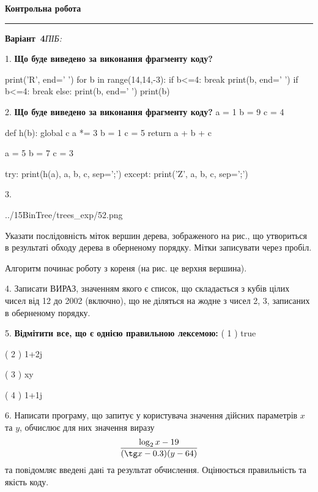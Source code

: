 \documentclass[11pt]{article}
\begin{document}
{\centering\Large\bfseries Контрольна робота\par}
\medskip
\noindent\rule{\linewidth}{0.5pt}
\smallskip
\noindent\textbf{Варіант \No\,4}\hfill \textit{ПІБ:}\,\underline{\hspace{60mm}}
\vspace{4mm}

1. \textbf{Що буде виведено за виконання фрагменту коду?}

print('R', end=' ')
for b in range(14,14,-3):
    if b<=4:
        break
        print(b, end=' ')
    if b<=4:
        break
    else:
        print(b, end=' ')
    print(b)
\vspace{5mm}

2. \textbf{Що буде виведено за виконання фрагменту коду?}
a = 1
b = 9
c = 4

def h(b):
global c    a *= 3
    b = 1
    c = 5
    return a + b + c

a = 5
b = 7
c = 3

try:
    print(h(a), a, b, c, sep=';')
except:
    print('Z', a, b, c, sep=';')
\vspace{5mm}

3. 

\begin{center}
	{../15BinTree/trees_exp/52.png}
\end{center}
Указати послідовність міток вершин дерева, зображеного на рис., що утвориться в результаті обходу дерева в оберненому порядку. Мітки записувати через пробіл.\par Алгоритм починає роботу з кореня (на рис. це верхня вершина).
\vspace{5mm}

4. 
Записати ВИРАЗ, значенням якого є список, що складається з кубів цілих чисел від 12 до 2002 (включно), що не діляться на жодне з чисел 2, 3, записаних в оберненому порядку.\vspace{5mm}

5. %
\textbf{Відмітити все, що є однією правильною лексемою:}
( 1 ) true

( 2 ) 1+2j

( 3 ) xy

( 4 ) 1+1j
\vspace{5mm}

6. 
Написати програму, що запитує у користувача значення дійсних параметрів $x$ та $y$, обчислює для них значення виразу 
$$\frac{\log_{2} x - 19}{(\tg x - 0.3) (y - 64)}$$ 
та повiдомляє введенi данi та результат обчислення.
 Оцінюється правильність та якість коду.
\end{document}
